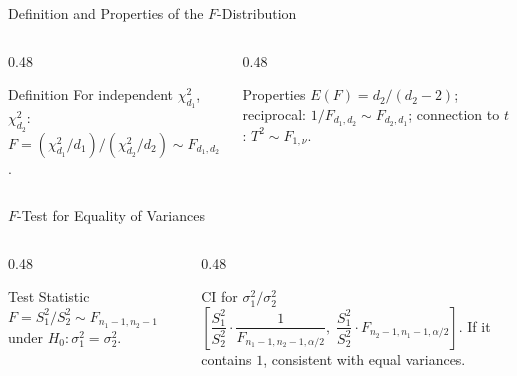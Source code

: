 \documentclass[aspectratio=169,xcolor={dvipsnames,table}]{beamer}
\begin{document}
\begin{frame}{Definition and Properties of the $F$-Distribution}
	\vspace{-0.15cm}
	\begin{columns}[T]
		\begin{column}{0.48\textwidth}
			\begin{block}{Definition}
				\footnotesize
				For independent $\chi^2_{d_1}$, $\chi^2_{d_2}$: $F=(\chi^2_{d_1}/d_1)/(\chi^2_{d_2}/d_2) \sim F_{d_1,d_2}$.
			\end{block}
		\end{column}
		\begin{column}{0.48\textwidth}
			\begin{alertblock}{Properties}
				\footnotesize
				$E(F)=d_2/(d_2-2)$; reciprocal: $1/F_{d_1,d_2}\sim F_{d_2,d_1}$; connection to $t$: $T^2\sim F_{1,\nu}$.
			\end{alertblock}
		\end{column}
	\end{columns}
\end{frame}

\begin{frame}{$F$-Test for Equality of Variances}
	\vspace{-0.15cm}
	\begin{columns}[T]
		\begin{column}{0.48\textwidth}
			\begin{block}{Test Statistic}
				\footnotesize
				$F=S_1^2/S_2^2 \sim F_{n_1-1,n_2-1}$ under $H_0:\sigma_1^2=\sigma_2^2$.
			\end{block}
		\end{column}
		\begin{column}{0.48\textwidth}
			\begin{alertblock}{CI for $\sigma_1^2/\sigma_2^2$}
				\footnotesize
				$\left[\dfrac{S_1^2}{S_2^2}\cdot\dfrac{1}{F_{n_1-1,n_2-1,\alpha/2}},\; \dfrac{S_1^2}{S_2^2}\cdot F_{n_2-1,n_1-1,\alpha/2}\right]$. If it contains $1$, consistent with equal variances.
			\end{alertblock}
		\end{column}
	\end{columns}
\end{frame}
\end{document}
